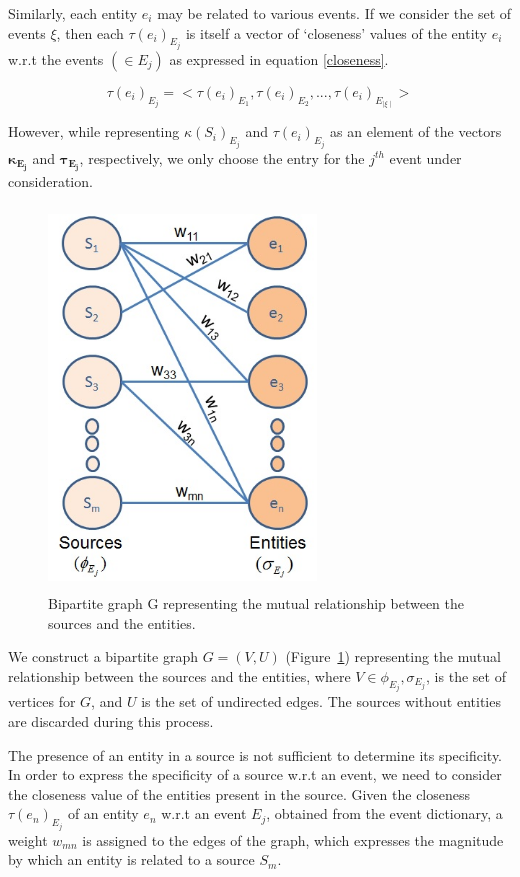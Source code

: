 \noindent Similarly, each entity  $e_{i}$ may be related to various events. If we consider the set of events $\xi$, then each $\tau(e_{i})_{E_{j}}$ is itself a vector of `closeness' values of the entity $e_{i}$ w.r.t the events $(\in E_{j})$ as expressed in equation \ref{closeness}.

\begin{equation}
\label{closeness}
\tau(e_{i})_{E_{j}} = <\tau(e_{i})_{E_{1}},\tau(e_{i})_{E_{2}},...,\tau(e_{i})_{E_{\mid \xi \mid}}>
\end{equation}

\noindent However, while representing $\kappa(S_{i})_{E_{j}}$ and $\tau(e_{i})_{E_{j}}$ as an element of the vectors $\mathbf{\kappa_{E_{j}}}$ and $\mathbf{\tau_{E_{j}}}$, respectively, we only choose the entry for the $j^{th}$ event under consideration.

\begin{figure}[htb]
\center
\includegraphics[height=4in,width=2.8in]{Figures/Chapter3Figures/graphnew.jpg} 
\caption{\small Bipartite graph G representing the mutual relationship between the sources and the entities.} 
\label{fg:graph}
\end{figure}

We construct a bipartite graph $G = (V, U)$ (Figure~\ref{fg:graph}) representing the mutual relationship between the sources and the entities, where $V \in \phi_{E_{j}}, \sigma_{E_{j}}$, is the set of vertices for $G$, and $U$ is the set of undirected edges. The sources without entities are discarded during this process.

The presence of an entity in a source is not sufficient to determine its specificity. In order to express the specificity of a source w.r.t an event, we need to consider the closeness value of the entities present in the source. Given the closeness $\tau(e_{n})_{E_{j}}$ of an entity $e_{n}$ w.r.t an event $E_{j}$, obtained from the event dictionary, a weight $w_{mn}$ is assigned to the edges of the graph, which expresses the magnitude by which an entity is related to a source $S_{m}$.  

